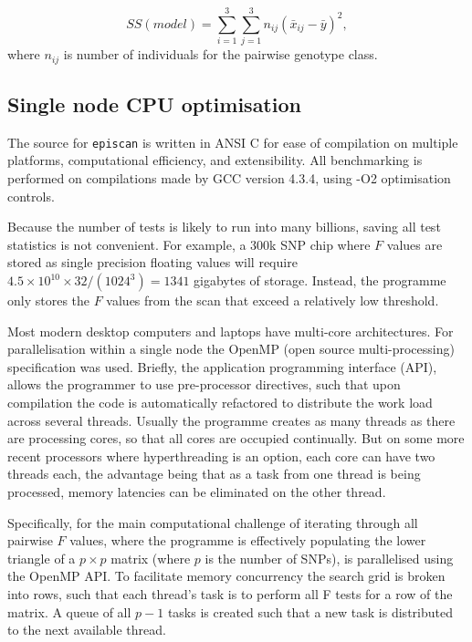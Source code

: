 \begin{equation}
SS(model) = \sum_{i=1}^{3}\sum_{j=1}^{3} n_{ij}(\bar{x}_{ij} - \bar{y})^{2}, \label{eq:ssfull}
\end{equation}
where $n_{ij}$ is number of individuals for the pairwise genotype class.

\subsection{Single node CPU optimisation}

The source for {\tt episcan} is written in ANSI C for ease of compilation on multiple platforms, computational efficiency, and extensibility. All benchmarking is performed on compilations made by GCC version 4.3.4, using -O2 optimisation controls.

Because the number of tests is likely to run into many billions, saving all test statistics is not convenient. For example, a 300k SNP chip where $F$ values are stored as single precision floating values will require $4.5 \times 10^{10} \times 32 / (1024^3) = 1341$ gigabytes of storage. Instead, the programme only stores the $F$ values from the scan that exceed a relatively low threshold. 

Most modern desktop computers and laptops have multi-core architectures. For parallelisation within a single node the OpenMP (open source multi-processing) specification was used. Briefly, the application programming interface (API), allows the programmer to use pre-processor directives, such that upon compilation the code is automatically refactored to distribute the work load across several threads. Usually the programme creates as many threads as there are processing cores, so that all cores are occupied continually. But on some more recent processors where hyperthreading is an option, each core can have two threads each, the advantage being that as a task from one thread is being processed, memory latencies can be eliminated on the other thread.

Specifically, for the main computational challenge of iterating through all pairwise $F$ values, where the programme is effectively populating the lower triangle of a $p \times p$ matrix (where $p$ is the number of SNPs), is parallelised using the OpenMP API. To facilitate memory concurrency the search grid is broken into rows, such that each thread's task is to perform all F tests for a row of the matrix. A queue of all $p-1$ tasks is created such that a new task is distributed to the next available thread.

